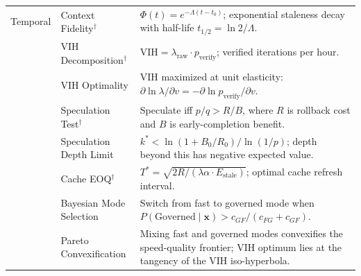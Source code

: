 \documentclass[11pt, a4paper, logo, copyright]{googledeepmind}
\begin{document}
\begin{appendices}
\begin{longtable}{p{1.6cm}p{3.2cm}p{7.8cm}}
Temporal
    & Context Fidelity$^\dagger$ & $\Phi(t) = e^{-\Lambda(t-t_0)}$; exponential staleness decay with half-life $t_{1/2} = \ln 2 / \Lambda$. \\
    & VIH Decomposition$^\dagger$ & $\text{VIH} = \lambda_{\text{raw}} \cdot p_{\text{verify}}$; verified iterations per hour. \\
    & VIH Optimality & VIH maximized at unit elasticity: $\partial \ln \lambda / \partial v = -\partial \ln p_{\text{verify}} / \partial v$. \\
    & Speculation Test$^\dagger$ & Speculate iff $p/q > R/B$, where $R$ is rollback cost and $B$ is early-completion benefit. \\
    & Speculation Depth Limit & $k^* < \ln(1 + B_0/R_0)/\ln(1/p)$; depth beyond this has negative expected value. \\
    & Cache EOQ$^\dagger$ & $T^* = \sqrt{2R/(\lambda\alpha \cdot E_{\text{stale}})}$; optimal cache refresh interval. \\
    & Bayesian Mode Selection & Switch from fast to governed mode when $P(\text{Governed} \mid \mathbf{x}) > c_{GF}/(c_{FG} + c_{GF})$. \\
    & Pareto Convexification & Mixing fast and governed modes convexifies the speed-quality frontier; VIH optimum lies at the tangency of the VIH iso-hyperbola. \\

\midrule


\end{longtable}
\end{appendices}
\end{document}
